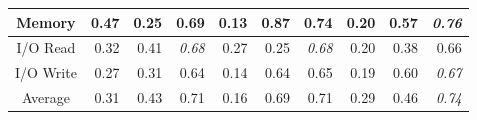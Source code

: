 \documentclass[10pt,journal,compsoc]{IEEEtran}
\begin{document}
\begin{table}
\begin{tabular}{|c|r|r|r|r|r|r|r|r|r|}
Memory            & 0.47  & 0.25    & 0.69 & 0.13  & 0.87    & 0.74 & 0.20  & 0.57    & \textit{0.76}            \\ \hline
I/O Read          & 0.32  & 0.41    & \textit{0.68}            & 0.27  & 0.25    & \textit{0.68}            & 0.20  & 0.38    & 0.66 \\ \hline
I/O Write         & 0.27  & 0.31    & 0.64 & 0.14  & 0.64    & 0.65 & 0.19  & 0.60    & \textit{0.67}            \\ \hline
Average           & 0.31  & 0.43    & 0.71 & 0.16  & 0.69    & 0.71 & 0.29  & 0.46    & \textit{0.74}            \\ \hline
\end{tabular}

\label{tab:model_evaluation_hadoop}
\end{table}
\end{document}
